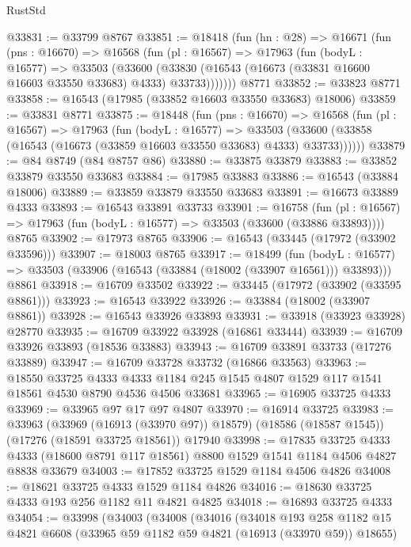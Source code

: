 \begin{lexlean}{RustStd}
\begin{coremodule}
@33831 := @33799 @8767
@33851 := @18418
    (fun (hn : @28) =>
    @16671
      (fun (pns : @16670) =>
      @16568
        (fun (pl : @16567) =>
        @17963
          (fun (bodyL : @16577) =>
          @33503
            (@33600
              (@33830 (@16543 (@16673 (@33831 @16600 @16603 @33550 @33683) @4333) @33733)))))))
    @8771
@33852 := @33823 @8771
@33858 := @16543 (@17985 (@33852 @16603 @33550 @33683) @18006)
@33859 := @33831 @8771
@33875 := @18448
    (fun (pns : @16670) =>
    @16568
      (fun (pl : @16567) =>
      @17963
        (fun (bodyL : @16577) =>
        @33503 (@33600 (@33858 (@16543 (@16673 (@33859 @16603 @33550 @33683) @4333) @33733))))))
@33879 := @84 @8749 (@84 @8757 @86)
@33880 := @33875 @33879
@33883 := @33852 @33879 @33550 @33683
@33884 := @17985 @33883
@33886 := @16543 (@33884 @18006)
@33889 := @33859 @33879 @33550 @33683
@33891 := @16673 @33889 @4333
@33893 := @16543 @33891 @33733
@33901 := @16758
    (fun (pl : @16567) => @17963 (fun (bodyL : @16577) => @33503 (@33600 (@33886 @33893))))
    @8765
@33902 := @17973 @8765
@33906 := @16543 (@33445 (@17972 (@33902 @33596)))
@33907 := @18003 @8765
@33917 := @18499
    (fun (bodyL : @16577) => @33503 (@33906 (@16543 (@33884 (@18002 (@33907 @16561))) @33893)))
    @8861
@33918 := @16709 @33502
@33922 := @33445 (@17972 (@33902 (@33595 @8861)))
@33923 := @16543 @33922
@33926 := @33884 (@18002 (@33907 @8861))
@33928 := @16543 @33926 @33893
@33931 := @33918 (@33923 @33928) @28770
@33935 := @16709 @33922 @33928 (@16861 @33444)
@33939 := @16709 @33926 @33893 (@18536 @33883)
@33943 := @16709 @33891 @33733 (@17276 @33889)
@33947 := @16709 @33728 @33732 (@16866 @33563)
@33963 := @18550
    @33725
    @4333
    @4333
    @1184
    @245
    @1545
    @4807
    @1529
    @117
    @1541
    @18561
    @4530
    @8790
    @4536
    @4506
    @33681
@33965 := @16905 @33725 @4333
@33969 := @33965 @97 @17 @97 @4807
@33970 := @16914 @33725
@33983 := @33963
    (@33969 (@16913 (@33970 @97)) @18579)
    (@18586 (@18587 @1545))
    (@17276 (@18591 @33725 @18561))
    @17940
@33998 := @17835
    @33725
    @4333
    @4333
    (@18600 @8791 @117 @18561)
    @8800
    @1529
    @1541
    @1184
    @4506
    @4827
    @8838
    @33679
@34003 := @17852 @33725 @1529 @1184 @4506 @4826
@34008 := @18621 @33725 @4333 @1529 @1184 @4826
@34016 := @18630 @33725 @4333 @193 @256 @1182 @11 @4821 @4825
@34018 := @16893 @33725 @4333
@34054 := @33998
    (@34003
      (@34008
        (@34016
          (@34018
            @193
            @258
            @1182
            @15
            @4821
            @6608
            (@33965 @59 @1182 @59 @4821 (@16913 (@33970 @59)) @18655)

\end{coremodule}
\end{lexlean}
